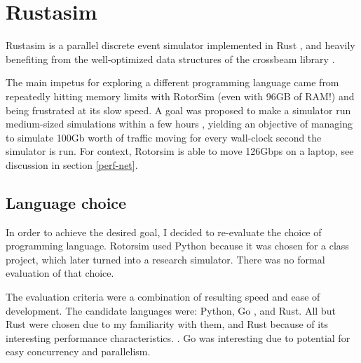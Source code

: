 \section{Rustasim} \label{rustasim}

Rustasim \cite{brode-roger_nibriviarustasim_2020} is a parallel discrete event simulator implemented in Rust \cite{klabnik_rust_2018}\cite{matsakis_rust_2014}, and heavily benefiting from the well-optimized data structures of the crossbeam library \cite{noauthor_crossbeam-rscrossbeam_2020}.

The main impetus for exploring a different programming language came from repeatedly hitting memory limits with RotorSim (even with 96GB of RAM!) and being frustrated at its slow speed. 
A goal was proposed to make a simulator run medium-sized simulations within a few hours , yielding an objective of managing to simulate 100Gb  worth of traffic moving for every wall-clock second the simulator is run.
For context, Rotorsim is able to move 126Gbps on a laptop, see discussion in section \ref{perf-net}.  


\subsection{Language choice} \label{rustasim-language}

In order to achieve the desired goal, I decided to re-evaluate the choice of programming language.
Rotorsim used Python because it was chosen for a class project, which later turned into a research simulator. 
There was no formal evaluation of that choice. 

The evaluation criteria were a combination of resulting speed and ease of development.
The candidate languages were: Python, Go \cite{donovan_go_2015}, and Rust.
All but Rust were chosen due to my familiarity with them, and Rust because of its interesting performance characteristics. .
Go was interesting due to potential for easy concurrency and parallelism.

